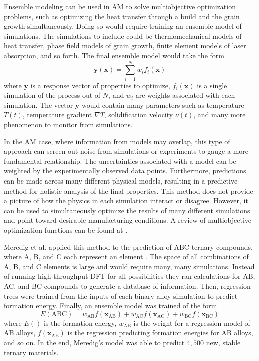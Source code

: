 Ensemble modeling can be used in AM to solve multiobjective optimization problems, such as optimizing the heat transfer through a build and the grain growth simultaneously. Doing so would require training an ensemble model of simulations. The simulations to include could be thermomechanical models of heat transfer, phase field models of grain growth, finite element models of laser absorption, and so forth. The final ensemble model would take the form
\begin{equation}
	\mathbf{y}(\mathbf{x}) = \sum_{i=1}^N w_i f_i(\mathbf{x})
	\label{ensemble}
\end{equation}
where $\mathbf{y}$ is a response vector of properties to optimize, $f_i(\mathbf{x})$ is a single simulation of the process out of $N$, and $w_i$ are weights associated with each simulation. The vector $\mathbf{y}$ would contain many parameters such as temperature $T(t)$, temperature gradient $\nabla T$, solidification velocity $\nu(t)$, and many more phenomenon to monitor from simulations. 

In the AM case, where information from models may overlap, this type of approach can screen out noise from simulations or experiments to gauge a more fundamental relationship. The uncertainties associated with a model can be weighted by the experimentally observed data points. Furthermore, predictions can be made across many different physical models, resulting in a predictive method for holistic analysis of the final properties. This method does not provide a picture of how the physics in each simulation interact or disagree. However, it can be used to simultaneously optimize the results of many different simulations and point toward desirable manufacturing conditions. A review of multiobjective optimization functions can be found at \cite{Jin2008}.

Meredig et al. applied this method to the prediction of ABC ternary compounds, where A, B, and C each represent an element \cite{Meredig2014}. The space of all combinations of A, B, and C elements is large and would require many, many simulations. Instead of running high-throughput DFT for all possibilities they ran calculations for AB, AC, and BC compounds to generate a database of information. Then, regression trees were trained from the inputs of each binary alloy simulation to predict formation energy. Finally, an ensemble model was trained of the form
\begin{equation}
	E(\text{ABC}) = w_{\text{AB}} f(\mathbf{x}_{\text{AB}}) + w_{\text{AC}} f(\mathbf{x}_{\text{AC}}) + w_{\text{BC}} f(\mathbf{x}_{\text{BC}})
	\label{dftensemble}
\end{equation}
where $E()$ is the formation energy, $w_\text{AB}$ is the weight for a regression model of AB alloys, $f(\mathbf{x}_{\text{AB}})$ is the regression predicting formation energies for AB alloys, and so on. In the end, Meredig's model was able to predict $4,500$ new, stable ternary materials.

